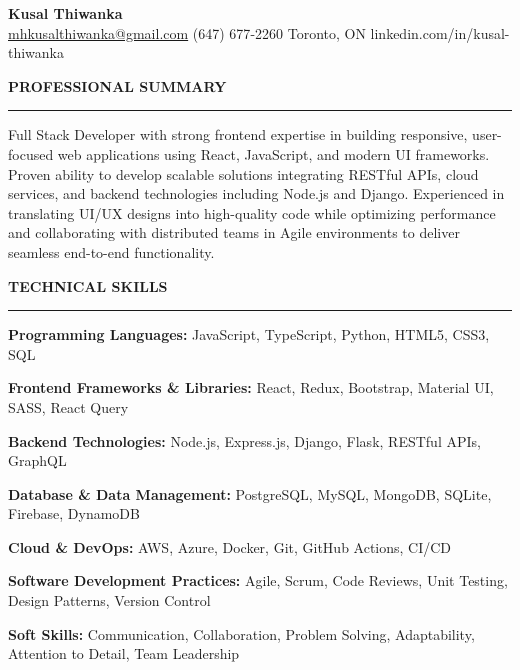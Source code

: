 \documentclass[10pt,letterpaper]{article}
\begin{document}
\begin{center}
{\LARGE\textbf{Kusal Thiwanka}}\\[3pt]
\href{mailto:mhkusalthiwanka@gmail.com}{mhkusalthiwanka@gmail.com}\hspace{2em}%
(647) 677{-}2260\hspace{2em}%
Toronto, ON\hspace{2em}
linkedin.com/in/kusal-thiwanka
\end{center}

\vspace{6pt}

\textbf{PROFESSIONAL SUMMARY}\\[-8pt]
\noindent\rule{\textwidth}{1pt}

\vspace{-2pt}

Full Stack Developer with strong frontend expertise in building responsive, user-focused web applications using React, JavaScript, and modern UI frameworks. Proven ability to develop scalable solutions integrating RESTful APIs, cloud services, and backend technologies including Node.js and Django. Experienced in translating UI/UX designs into high-quality code while optimizing performance and collaborating with distributed teams in Agile environments to deliver seamless end-to-end functionality.

\vspace{8pt}

\textbf{TECHNICAL SKILLS}\\[-8pt]
\noindent\rule{\textwidth}{1pt}

\vspace{-2pt}

\textbf{Programming Languages:} JavaScript, TypeScript, Python, HTML5, CSS3, SQL

\textbf{Frontend Frameworks \& Libraries:} React, Redux, Bootstrap, Material UI, SASS, React Query

\textbf{Backend Technologies:} Node.js, Express.js, Django, Flask, RESTful APIs, GraphQL

\textbf{Database \& Data Management:} PostgreSQL, MySQL, MongoDB, SQLite, Firebase, DynamoDB

\textbf{Cloud \& DevOps:} AWS, Azure, Docker, Git, GitHub Actions, CI/CD

\textbf{Software Development Practices:} Agile, Scrum, Code Reviews, Unit Testing, Design Patterns, Version Control

\textbf{Soft Skills:} Communication, Collaboration, Problem Solving, Adaptability, Attention to Detail, Team Leadership
\end{document}
